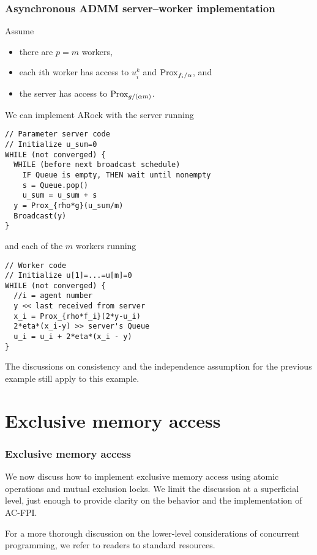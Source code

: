 \documentclass[10pt,mathserif]{beamer}
\begin{document}
\begin{frame}[fragile]
\frametitle{Asynchronous ADMM server--worker implementation}
Assume
\begin{itemize}
    \item there are $p=m$ workers,
    \item each $i$th worker has access to $u_i^k$ and $\mathrm{Prox}_{ f_i/\alpha}$, and
    \item the server has access to $\mathrm{Prox}_{ g/(\alpha m)}$.
\end{itemize}
\medskip

We can implement ARock with the server running
\begin{lstlisting}
// Parameter server code
// Initialize u_sum=0
WHILE (not converged) {
  WHILE (before next broadcast schedule)
    IF Queue is empty, THEN wait until nonempty
    s = Queue.pop()
    u_sum = u_sum + s
  y = Prox_{rho*g}(u_sum/m)
  Broadcast(y)
}
\end{lstlisting}
\end{frame}


\begin{frame}[fragile]
and each of the $m$ workers running
\begin{lstlisting}
// Worker code
// Initialize u[1]=...=u[m]=0
WHILE (not converged) {
  //i = agent number
  y << last received from server
  x_i = Prox_{rho*f_i}(2*y-u_i)
  2*eta*(x_i-y) >> server's Queue
  u_i = u_i + 2*eta*(x_i - y)
}
\end{lstlisting}
\medskip

The discussions on consistency and the independence assumption for the previous example still apply to this example.

\end{frame}


\section{Exclusive memory access}



\begin{frame}
\frametitle{Exclusive memory access}
We now discuss how to implement exclusive memory access using atomic operations and mutual exclusion locks.
We limit the discussion at a superficial level, just enough to provide clarity on the behavior and the implementation of AC-FPI.

\bigskip

For a more thorough discussion on the lower-level considerations of concurrent programming, we refer to readers to standard resources.
\end{frame}
\end{document}
